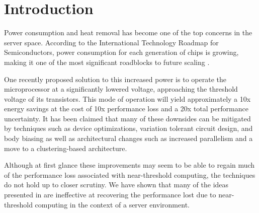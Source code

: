 \section{Introduction}
\label{sec:intro}

Power consumption and heat removal has become one of the top concerns in the server space. According to the International Technology Roadmap for Semiconductors, power consumption for each generation of chips is growing, making it one of the most significant roadblocks to future scaling \cite{Devised_2009}. 

One recently proposed  solution to this increased power is to operate the microprocessor at a significantly lowered voltage, approaching the threshold voltage of its transistors\cite{Dreslinski:2010ez}. This mode of operation will yield approximately a 10x energy savings at the cost of 10x performance loss and a 20x total performance uncertainty. It has been claimed that many of these downsides can be mitigated by techniques such as device optimizations, variation tolerant circuit design, and body biasing as well as architectural changes such as increased parallelism and a move to a clustering-based architecture.

Although at first glance these improvements may seem to be able to regain much of the performance loss associated with near-threshold computing, the techniques do not hold up to closer scrutiny. We have shown that many of the ideas presented in \cite{Dreslinski:2010ez} are ineffective at recovering the performance lost due to near-threshold computing in the context of a server environment.